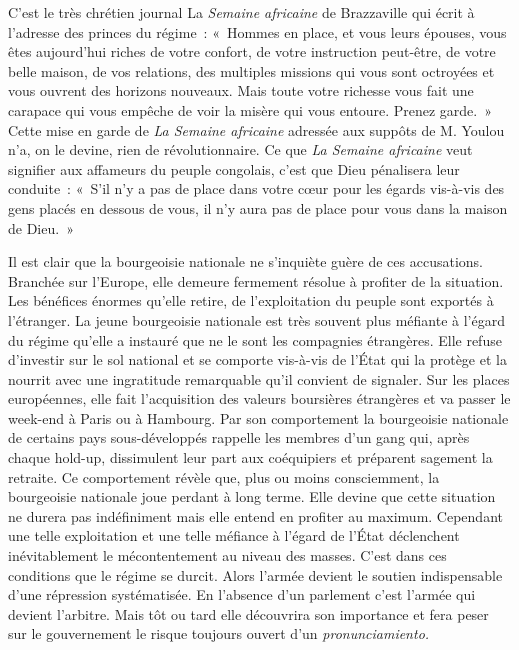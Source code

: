 \documentclass[french,twoside]{book} %
\begin{document}
C’est le très chrétien journal La \emph{Semaine africaine} de Brazzaville qui écrit à l’adresse des princes du régime : « Hommes en place, et vous leurs épouses, vous êtes aujourd’hui riches de votre confort, de votre instruction peut-être, de votre belle maison, de vos relations, des multiples missions qui vous sont octroyées et vous ouvrent des horizons nouveaux. Mais toute votre richesse vous fait une carapace qui vous empêche de voir la misère qui vous entoure. Prenez garde. » Cette mise en garde de \emph{La Semaine africaine} adressée aux suppôts de M. Youlou n’a, on le devine, rien de révolutionnaire. Ce que \emph{La Semaine africaine} veut signifier aux affameurs du peuple congolais, c’est que Dieu pénalisera leur conduite : « S’il n’y a pas de place dans votre cœur pour les égards vis-à-vis des gens placés en dessous de vous, il n’y aura pas de place pour vous dans la maison de Dieu. »\par
\bigbreak
\noindent Il est clair que la bourgeoisie nationale ne s’inquiète guère de ces accusations. Branchée sur l’Europe, elle demeure fermement résolue à profiter de la situation. Les bénéfices énormes qu’elle retire, de l’exploitation du peuple sont exportés à l’étranger. La jeune bourgeoisie nationale est très souvent plus méfiante à l’égard du régime qu’elle a instauré que ne le sont les compagnies étrangères. Elle refuse d’investir sur le sol national et se comporte vis-à-vis de l’État qui la protège et la nourrit avec une ingratitude remarquable qu’il convient de signaler. Sur les places européennes, elle fait l’acquisition des valeurs boursières   étrangères et va passer le week-end à Paris ou à Hambourg. Par son comportement la bourgeoisie nationale de certains pays sous-développés rappelle les membres d’un gang qui, après chaque hold-up, dissimulent leur part aux coéquipiers et préparent sagement la retraite. Ce comportement révèle que, plus ou moins consciemment, la bourgeoisie nationale joue perdant à long terme. Elle devine que cette situation ne durera pas indéfiniment mais elle entend en profiter au maximum. Cependant une telle exploitation et une telle méfiance à l’égard de l’État déclenchent inévitablement le mécontentement au niveau des masses. C’est dans ces conditions que le régime se durcit. Alors l’armée devient le soutien indispensable d’une répression systématisée. En l’absence d’un parlement c’est l’armée qui devient l’arbitre. Mais tôt ou tard elle découvrira son importance et fera peser sur le gouvernement le risque toujours ouvert d’un \emph{pronunciamiento.}\par
\end{document}
